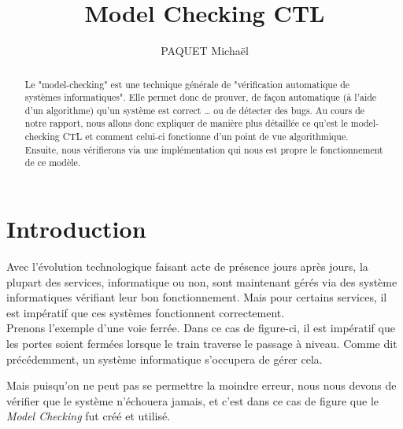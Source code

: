 \documentclass[runningheads,a4paper]{llncs}
\begin{document}
\mainmatter 

\title{Model Checking CTL}


\author{PAQUET Michaël}



\tocauthor{{}}

\maketitle

\begin{abstract}
Le "model-checking" est une technique générale de "vérification automatique de systèmes informatiques". Elle permet donc de prouver, de façon automatique (à l'aide d'un algorithme) qu'un système est correct … ou de détecter des bugs. Au cours de notre rapport, nous allons donc expliquer de manière plus détaillée ce qu'est le model-checking CTL et comment celui-ci fonctionne d'un point de vue algorithmique. Ensuite, nous vérifierons via une implémentation qui nous est propre le fonctionnement de ce modèle. 
\end{abstract}

\medskip

\begingroup
\let\clearpage\relax
\tableofcontents
{}
\endgroup

\medskip
\medskip

\newpage 

\section*{Introduction}

Avec l'évolution technologique faisant acte de présence jours après jours, la plupart des services, informatique ou non, sont maintenant gérés via des système informatiques vérifiant leur bon fonctionnement. Mais pour certains services, il est impératif que ces systèmes fonctionnent correctement.\\


\noindent Prenons l'exemple d'une voie ferrée. Dans ce cas de figure-ci, il est impératif que les portes soient fermées lorsque le train traverse le passage à niveau. Comme dit précédemment, un système informatique s'occupera de gérer cela.

\noindent Mais puisqu'on ne peut pas se permettre la moindre erreur, nous nous devons de vérifier que le système n'échouera jamais, et c'est dans ce cas de figure que le \textit{Model Checking} fut créé et utilisé.\\
\end{document}

